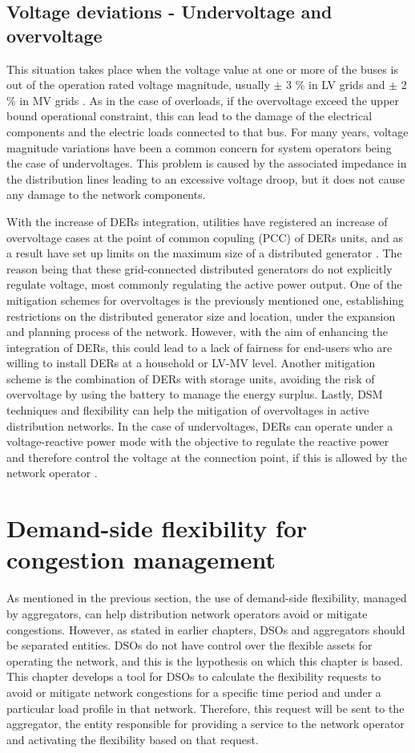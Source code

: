\subsection{Voltage deviations - Undervoltage and overvoltage}
This situation takes place when the voltage value at one or more of the buses is out of the operation rated voltage magnitude, usually $\pm$ 3 \% in LV grids and $\pm$ 2 \% in MV grids \cite{BAYER2020336}. As in the case of overloads, if the overvoltage exceed the upper bound operational constraint, this can lead to the damage of the electrical components and the electric loads connected to that bus. 
For many years, voltage magnitude variations have been a common concern for system operators being the case of undervoltages. This problem is caused by the associated impedance in the distribution lines leading to an excessive voltage droop, but it does not cause any damage to the network components.  

With the increase of DERs integration, utilities have registered an increase of overvoltage cases at the point of common copuling (PCC) of DERs units, and as a result have set up limits on the maximum size of a distributed generator \cite{Kennedy2014}. The reason being that these grid-connected distributed generators do not explicitly regulate voltage, most commonly regulating the active power output. One of the mitigation schemes for overvoltages is the previously mentioned one, establishing restrictions on the distributed generator size and location, under the expansion and planning process of the network. However, with the aim of enhancing the integration of DERs, this could lead to a lack of fairness for end-users who are willing to install DERs at a household or LV-MV level. Another mitigation scheme is the combination of DERs with storage units, avoiding the risk of overvoltage by using the battery to manage the energy surplus. Lastly, DSM techniques and flexibility can help the mitigation of overvoltages in active distribution networks. In the case of undervoltages, DERs can operate under a voltage-reactive power mode with the objective to regulate the reactive power and therefore control the voltage at the connection point, if this is allowed by the network operator \cite{interconnection_ders}. 

\section{Demand-side flexibility for congestion management}
As mentioned in the previous section, the use of demand-side flexibility, managed by aggregators, can help distribution network operators avoid or mitigate congestions. However, as stated in earlier chapters, DSOs and aggregators should be separated entities. DSOs do not have control over the flexible assets for operating the network, and this is the hypothesis on which this chapter is based. This chapter develops a tool for DSOs to calculate the flexibility requests to avoid or mitigate network congestions for a specific time period and under a particular load profile in that network. Therefore, this request will be sent to the aggregator, the entity responsible for providing a service to the network operator and activating the flexibility based on that request. 

